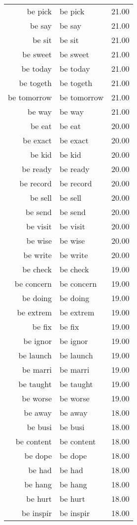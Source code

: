 \begin{table}[ht]
\begin{tabular}{rlr}
  be pick & be pick & 21.00 \\ 
  be say & be say & 21.00 \\ 
  be sit & be sit & 21.00 \\ 
  be sweet & be sweet & 21.00 \\ 
  be today & be today & 21.00 \\ 
  be togeth & be togeth & 21.00 \\ 
  be tomorrow & be tomorrow & 21.00 \\ 
  be way & be way & 21.00 \\ 
  be eat & be eat & 20.00 \\ 
  be exact & be exact & 20.00 \\ 
  be kid & be kid & 20.00 \\ 
  be ready & be ready & 20.00 \\ 
  be record & be record & 20.00 \\ 
  be sell & be sell & 20.00 \\ 
  be send & be send & 20.00 \\ 
  be visit & be visit & 20.00 \\ 
  be wise & be wise & 20.00 \\ 
  be write & be write & 20.00 \\ 
  be check & be check & 19.00 \\ 
  be concern & be concern & 19.00 \\ 
  be doing & be doing & 19.00 \\ 
  be extrem & be extrem & 19.00 \\ 
  be fix & be fix & 19.00 \\ 
  be ignor & be ignor & 19.00 \\ 
  be launch & be launch & 19.00 \\ 
  be marri & be marri & 19.00 \\ 
  be taught & be taught & 19.00 \\ 
  be worse & be worse & 19.00 \\ 
  be away & be away & 18.00 \\ 
  be busi & be busi & 18.00 \\ 
  be content & be content & 18.00 \\ 
  be dope & be dope & 18.00 \\ 
  be had & be had & 18.00 \\ 
  be hang & be hang & 18.00 \\ 
  be hurt & be hurt & 18.00 \\ 
  be inspir & be inspir & 18.00 \\ 

\end{tabular}
\end{table}
